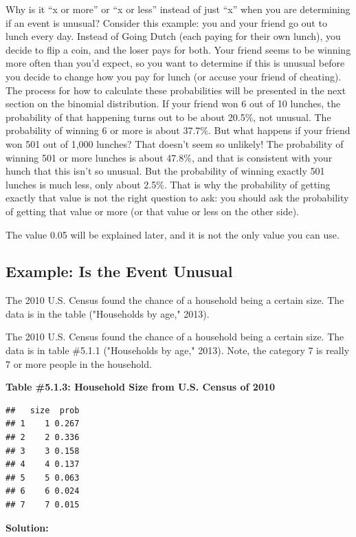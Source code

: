\documentclass[]{book}
\begin{document}
Why is it ``x or more'' or ``x or less'' instead of just ``x'' when you are determining if an event is unusual? Consider this example: you and your friend go out to lunch every day. Instead of Going Dutch (each paying for their own lunch), you decide to flip a coin, and the loser pays for both. Your friend seems to be winning more often than you'd expect, so you want to determine if this is unusual before you decide to change how you pay for lunch (or accuse your friend of cheating). The process for how to calculate these probabilities will be presented in the next section on the binomial distribution. If your friend won 6 out of 10 lunches, the probability of that happening turns out to be about 20.5\%, not unusual. The probability of winning 6 or more is about 37.7\%. But what happens if your friend won 501 out of 1,000 lunches? That doesn't seem so unlikely! The probability of winning 501 or more lunches is about 47.8\%, and that is consistent with your hunch that this isn't so unusual. But the probability of winning exactly 501 lunches is much less, only about 2.5\%. That is why the probability of getting exactly that value is not the right question to ask: you should ask the probability of getting that value or more (or that value or less on the other side).

The value 0.05 will be explained later, and it is not the only value you can use.

\hypertarget{example-is-the-event-unusual}{%
\subsection{Example: Is the Event Unusual}\label{example-is-the-event-unusual}}

The 2010 U.S. Census found the chance of a household being a certain
size. The data is in the table ("Households by age," 2013).

The 2010 U.S. Census found the chance of a household being a certain
size. The data is in table \#5.1.1 ("Households by age," 2013). Note, the category 7 is really 7 or more people in the household.

\textbf{Table \#5.1.3: Household Size from U.S. Census of 2010}

\begin{verbatim}
##   size  prob
## 1    1 0.267
## 2    2 0.336
## 3    3 0.158
## 4    4 0.137
## 5    5 0.063
## 6    6 0.024
## 7    7 0.015
\end{verbatim}

\textbf{Solution:}
\end{document}
